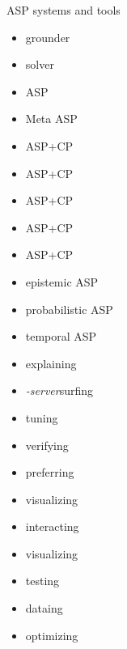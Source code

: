 \providecommand{\purpose}[1]{\hfill #1}
\begin{frame}[c]{ASP systems and tools}
  \begin{minipage}[t]{0.5\linewidth}
    \begin{itemize}
    \item \gringo\purpose{grounder}
    \item \clasp\purpose{solver}
    \item \clingo\purpose{ASP}
    \item \metasp\purpose{Meta ASP}
    \item \clingcon\purpose{ASP+CP}
    \item \fclingo\purpose{ASP+CP}
    \item \clingodl\purpose{ASP+CP}
    \item \clingolp\purpose{ASP+CP}
    \item \clingolpx\purpose{ASP+CP}
    \item \eclingo\purpose{epistemic ASP}
    \item \plingo\purpose{probabilistic ASP}
    \item \telingo\purpose{temporal ASP}
    \end{itemize}
  \end{minipage}
  \pause
  \begin{minipage}[t]{0.4\linewidth}
    \begin{itemize}
    \item \xclingo\purpose{explaining}
    \item \clingo\textit{-server}\purpose{surfing}
    \item \acclingo\purpose{tuning}
    \item \anthem\purpose{verifying}
    \item \asprin\purpose{preferring}
    \item \clingraph\purpose{visualizing}
    \item \clinguin\purpose{interacting}
    \item \viasp\purpose{visualizing}
    \item \clintest\purpose{testing}
    \item \clorm\purpose{dataing}
    \item \ngo\purpose{optimizing}
  \end{itemize}
\end{minipage}
\end{frame}
%
